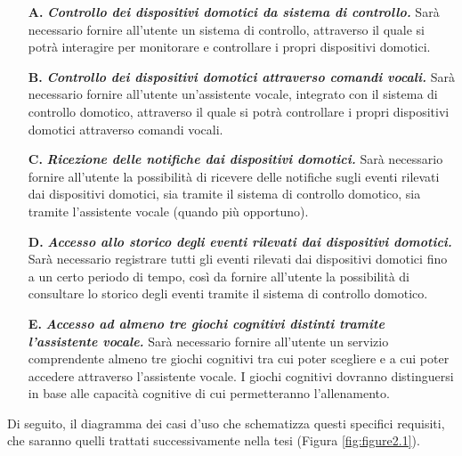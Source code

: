 \begin{enumerate}
  \item[\textbf{A.}] \textit{\textbf{Controllo dei dispositivi domotici da
            sistema di controllo.}} Sarà necessario fornire all’utente un
        sistema di controllo, attraverso il quale si potrà interagire per
        monitorare e controllare i propri dispositivi domotici.
  \item[\textbf{B.}] \textit{\textbf{Controllo dei dispositivi domotici
            attraverso comandi vocali.}} Sarà necessario fornire all’utente
        un’assistente vocale, integrato con il sistema di controllo domotico,
        attraverso il quale si potrà controllare i propri dispositivi domotici
        attraverso comandi vocali.
  \item[\textbf{C.}] \textit{\textbf{Ricezione delle notifiche dai dispositivi
            domotici.}} Sarà necessario fornire all’utente la possibilità di
        ricevere delle notifiche sugli eventi rilevati dai dispositivi
        domotici, sia tramite il sistema di controllo domotico, sia tramite
        l’assistente vocale (quando più opportuno).
  \item[\textbf{D.}] \textit{\textbf{Accesso allo storico degli eventi rilevati
            dai dispositivi domotici.}} Sarà necessario registrare tutti gli
        eventi rilevati dai dispositivi domotici fino a un certo periodo di
        tempo, così da fornire all’utente la possibilità di consultare lo
        storico degli eventi tramite il sistema di controllo domotico.
  \item[\textbf{E.}] \textit{\textbf{Accesso ad almeno tre giochi cognitivi
            distinti tramite l’assistente vocale.}} Sarà necessario fornire
        all’utente un servizio comprendente almeno tre giochi cognitivi tra
        cui poter scegliere e a cui poter accedere attraverso l’assistente
        vocale. I giochi cognitivi dovranno distinguersi in base alle
        capacità cognitive di cui permetteranno l’allenamento.
\end{enumerate}

Di seguito, il diagramma dei casi d’uso che schematizza questi specifici
requisiti, che saranno quelli trattati successivamente nella tesi (Figura
\ref{fig:figure2.1}).

